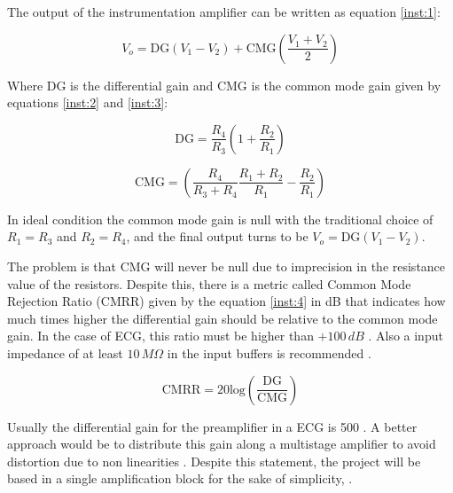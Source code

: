 The output of the instrumentation amplifier can be written as equation \ref{inst:1}:

\begin{center}
\begin{equation} \label{inst:1}
        V_o = \text{DG}(V_1-V_2)+\text{CMG}\left(\frac{V_1+V_2}{2}\right)
\end{equation}
\end{center}

Where $\text{DG}$ is the differential gain and $\text{CMG}$ is the common mode gain given by equations \ref{inst:2} and \ref{inst:3}:

\begin{center}
\begin{equation} \label{inst:2}
    \text{DG} = \frac{R_4}{R_3} \left(1+\frac{R_2}{R_1}\right)
\end{equation}
\end{center}

\begin{center}
\begin{equation} \label{inst:3}
    \text{CMG} = \left(\frac{R_4}{R_3+R_4}\frac{R_1+R_2}{R_1} - \frac{R_2}{R_1}\right)
\end{equation}
\end{center}

In ideal condition the common mode gain is null with the traditional choice of $R_1=R_3$ and $R_2=R_4$, and the final output turns to be $V_o = \text{DG}(V_1-V_2)$.

The problem is that $\text{CMG}$ will never be null due to imprecision in the resistance value of the resistors. Despite this, there is a metric called Common Mode Rejection Ratio (CMRR) given by the equation \ref{inst:4} in dB that indicates how much times higher the differential gain should be relative to the common mode gain. In the case of ECG, this ratio must be higher than $+ 100 \, dB$ \cite{khandpur2019compendium,khandpur2005biomedical}.  Also a input impedance of at least $10 \, M\Omega$ in the input buffers is recommended \cite{khandpur1987handbook}.

\begin{center}
\begin{equation} \label{inst:4}
    \text{CMRR} = 20\text{log}\left(\frac{\text{DG}}{\text{CMG}}\right)
\end{equation}
\end{center}

Usually the differential gain for the preamplifier in a ECG is 500 \cite{khandpur2019compendium}. A better approach would be to distribute this gain along a multistage amplifier to avoid distortion due to non linearities \cite{sedra2020microelectronic}. Despite this statement, the project will be based in a single amplification block for the sake of simplicity, .

